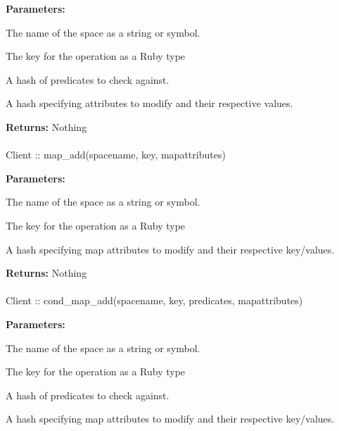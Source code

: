 \noindent\textbf{Parameters:}
\begin{description}[labelindent=\widthof{{predicates}},leftmargin=*,noitemsep,nolistsep,align=right]
\item[spacename] The name of the space as a string or symbol.
\item[key] The key for the operation as a Ruby type
\item[predicates] A hash of predicates to check against.
\item[attributes] A hash specifying attributes to modify and their respective values.
\end{description}

\noindent\textbf{Returns:}
Nothing

\paragraph{}
\begin{ccode}
Client :: map_add(spacename, key, mapattributes)
\end{ccode}
\funcdesc 

\noindent\textbf{Parameters:}
\begin{description}[labelindent=\widthof{{mapattributes}},leftmargin=*,noitemsep,nolistsep,align=right]
\item[spacename] The name of the space as a string or symbol.
\item[key] The key for the operation as a Ruby type
\item[mapattributes] A hash specifying map attributes to modify and their respective key/values.
\end{description}

\noindent\textbf{Returns:}
Nothing

\paragraph{}
\begin{ccode}
Client :: cond_map_add(spacename, key, predicates, mapattributes)
\end{ccode}
\funcdesc 

\noindent\textbf{Parameters:}
\begin{description}[labelindent=\widthof{{mapattributes}},leftmargin=*,noitemsep,nolistsep,align=right]
\item[spacename] The name of the space as a string or symbol.
\item[key] The key for the operation as a Ruby type
\item[predicates] A hash of predicates to check against.
\item[mapattributes] A hash specifying map attributes to modify and their respective key/values.
\end{description}

